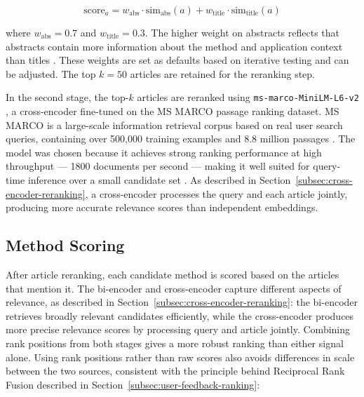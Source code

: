 \begin{equation}
    \text{score}_a = w_{\text{abs}} \cdot \text{sim}_{\text{abs}}(a)
                   + w_{\text{title}} \cdot \text{sim}_{\text{title}}(a)
    \label{eq:article-score}
\end{equation}

where $w_{\text{abs}} = 0.7$ and $w_{\text{title}} = 0.3$. The 
higher weight on abstracts reflects that abstracts contain more 
information about the method and application context than titles 
\parencite{westergaard2018comprehensive_quantitative_comparison_text_mining_15_million_full_text_articles_versus_corresponding_abstracts}. 
These weights are set as defaults based on iterative testing 
and can be adjusted. The top $k = 50$ articles are retained 
for the reranking step.

In the second stage, the top-$k$ articles are reranked using 
\texttt{ms-marco-MiniLM-L6-v2} \parencite{sbert_ce_msmarco}, a 
cross-encoder fine-tuned on the MS MARCO passage ranking dataset. 
MS MARCO is a large-scale information retrieval corpus based on 
real user search queries, containing over 500,000 training 
examples and 8.8 million passages \parencite{sbert_ce_msmarco}. 
The model was chosen because it achieves strong ranking 
performance at high throughput — 1800 documents per second — 
making it well suited for query-time inference over a small 
candidate set \parencite{sbert_ce_msmarco}. As described in 
Section~\ref{subsec:cross-encoder-reranking}, a cross-encoder 
processes the query and each article jointly, producing more 
accurate relevance scores than independent embeddings.

\subsection{Method Scoring}
\label{subsec:method-scoring}

After article reranking, each candidate method is scored based 
on the articles that mention it. The bi-encoder and cross-encoder 
capture different aspects of relevance, as described in 
Section~\ref{subsec:cross-encoder-reranking}: the bi-encoder 
retrieves broadly relevant candidates efficiently, while the 
cross-encoder produces more precise relevance scores by 
processing query and article jointly. Combining rank positions 
from both stages gives a more robust ranking than either signal 
alone. Using rank positions rather than raw scores also avoids 
differences in scale between the two sources, consistent with 
the principle behind Reciprocal Rank Fusion described in 
Section~\ref{subsec:user-feedback-ranking}:

